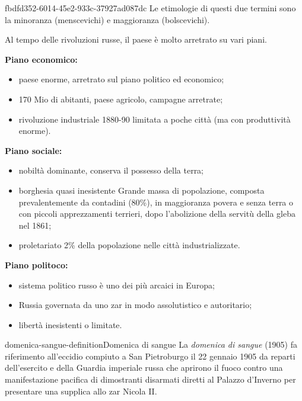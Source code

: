 \documentclass[preview]{standalone}
\begin{document}
\begin{snippet}{fbdfd352-6014-45e2-933c-37927ad087dc}
    Le etimologie di questi due termini sono la minoranza (menscevichi)
    e maggioranza (bolscevichi).
    
    Al tempo delle rivoluzioni russe, il paese è molto arretrato su vari piani.
    
    \textbf{Piano economico:}
    \begin{itemize}
        \item paese enorme, arretrato sul piano politico ed economico;
        \item 170 Mio di abitanti, paese agricolo, campagne arretrate;
        \item rivoluzione industriale 1880-90 limitata a poche città (ma con produttività enorme). 
    \end{itemize}
    
    \textbf{Piano sociale:}
    \begin{itemize}
        \item nobiltà dominante, conserva il possesso della terra;
        \item borghesia quasi inesistente
        Grande massa di popolazione, composta prevalentemente da contadini (80\%),
        in maggioranza povera e senza terra o con piccoli apprezzamenti terrieri, dopo l'abolizione della servitù
        della gleba nel 1861;
        \item proletariato 2\% della popolazione nelle città industrializzate.
    \end{itemize}
    
    \textbf{Piano politoco:}
    \begin{itemize}
        \item sistema politico russo è uno dei più arcaici in Europa;
        \item Russia governata da uno zar in modo assolutistico e autoritario;
        \item libertà inesistenti o limitate.
    \end{itemize}
\end{snippet}

\begin{snippetdefinition}{domenica-sangue-definition}{Domenica di sangue}
    La \textit{domenica di sangue} (1905) fa riferimento all'eccidio compiuto a San Pietroburgo
    il 22 gennaio 1905 da reparti dell'esercito e della Guardia imperiale russa
    che aprirono il fuoco contro una manifestazione pacifica di dimostranti disarmati
    diretti al Palazzo d'Inverno per presentare una supplica allo zar Nicola II. 
\end{snippetdefinition}
\end{document}
